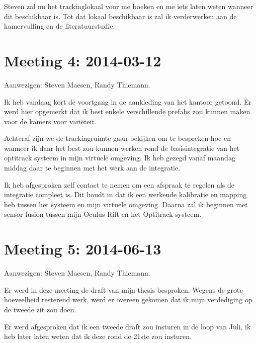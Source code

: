 Steven zal nu het trackinglokaal voor me boeken en me iets laten weten wanneer
dit beschikbaar is. Tot dat lokaal beschikbaar is zal ik verderwerken aan de
kamervulling en de literatuurstudie.


\section{Meeting 4: 2014-03-12}
Aanwezigen: Steven Maesen, Randy Thiemann.

Ik heb vandaag kort de voortgang in de aankleding van het kantoor getoond. Er 
werd hier opgemerkt dat ik best enkele verschillende prefabs zou kunnen maken
voor de kamers voor variëteit.

Achteraf zijn we de trackingruimte gaan bekijken om te bespreken hoe en wanneer
ik daar het best zou kunnen werken rond de basisintegratie van het optitrack
systeem in mijn virtuele omgeving. Ik heb gezegd vanaf maandag middag daar te
beginnen met het werk aan de integratie.

Ik heb afgesproken zelf contact te nemen om een afspraak te regelen als de
integratie compleet is. Dit houdt in dat ik een werkende kalibratie en mapping
heb tussen het systeem en mijn virtuele omgeving. Daarna zal ik beginnen met
sensor fusion tussen mijn Oculus Rift en het Optitrack systeem.

\section{Meeting 5: 2014-06-13}
Aanwezigen: Steven Maesen, Randy Thiemann.

Er werd in deze meeting de draft van mijn thesis besproken. Wegens de grote
hoeveelheid resterend werk, werd er overeen gekomen dat ik mijn verdediging op de
tweede zit zou doen.

Er werd afgesproken dat ik een tweede draft zou insturen in de loop van Juli,
ik heb later laten weten dat ik deze rond de 21ste zou insturen.